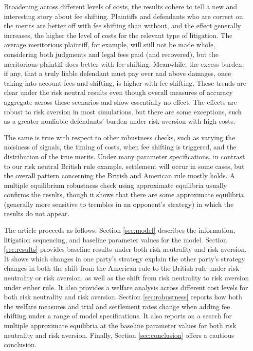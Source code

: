 \documentclass{article}
\begin{document}
Broadening across different levels of costs, the results cohere to tell a new and interesting story about fee shifting. Plaintiffs and defendants who are correct on the merits are better off with fee shifting than without, and the effect generally increases, the higher the level of costs for the relevant type of litigation. The average meritorious plaintiff, for example, will still not be made whole, considering both judgments and legal fees paid (and recovered), but the meritorious plaintiff does better with fee shifting. Meanwhile, the excess burden, if any, that a truly liable defendant must pay over and above damages, once taking into account fees and shifting, is higher with fee shifting. These trends are clear under the risk neutral results even though overall measures of accuracy aggregate across these scenarios and show essentially no effect. The effects are robust to risk aversion in most simulations, but there are some exceptions, such as a greater nonliable defendants' burden under risk aversion with high costs. 

The same is true with respect to other robustness checks, such as varying the noisiness of signals, the timing of costs, when fee shifting is triggered, and the distribution of the true merits. Under many parameter specifications, in contrast to our risk neutral British rule example, settlement will occur in some cases, but the overall pattern concerning the British and American rule mostly holds. A multiple equilibrium robustness check using approximate equilibria usually confirms the results, though it shows that there are some approximate equilibria (generally more sensitive to trembles in an opponent's strategy) in which the results do not appear. 

The article proceeds as follows. Section \ref{sec:model} describes the information, litigation sequencing, and baseline parameter values for the model. Section \ref{sec:results} provides baseline results under both risk neutrality and risk aversion. It shows which changes in one party's strategy explain the other party's strategy changes in both the shift from the American rule to the British rule under risk neutrality or risk aversion, as well as the shift from risk neutrality to risk aversion under either rule. It also provides a welfare analysis across different cost levels for both risk neutrality and risk aversion. Section \ref{sec:robustness} reports how both the welfare measures and trial and settlement rates change when adding fee shifting under a range of model specifications. It also reports on a search for multiple approximate equilibria at the baseline parameter values for both risk neutrality and risk aversion. Finally, Section \ref{sec:conclusion} offers a cautious conclusion. 
\end{document}

